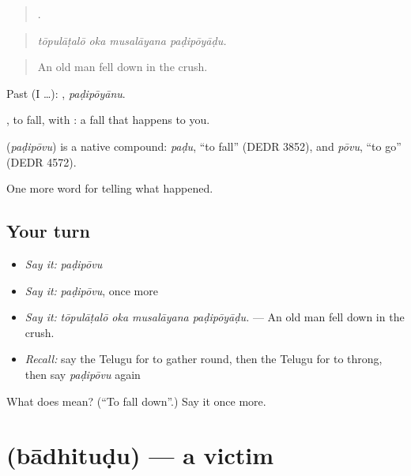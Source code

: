\begin{quote}
   .
\end{quote}

\begin{quote}
\emph{tōpulāṭalō oka musalāyana paḍipōyāḍu.}
\end{quote}

\begin{quote}
An old man fell down in the crush.
\end{quote}

Past (I …): , \emph{paḍipōyānu}.

, to fall, with : a fall that happens to you.

\begin{cousinweb}
\textbf{} (\emph{paḍipōvu}) is a native compound: \emph{paḍu}, \textquotedblleft{}to fall\textquotedblright{} (DEDR 3852), and \emph{pōvu}, \textquotedblleft{}to go\textquotedblright{} (DEDR 4572).
\end{cousinweb}

\begin{grammarlens}[title={What you've built}]
One more word for telling what happened.
\end{grammarlens}

\subsection*{Your turn}
\begin{itemize}
\raggedright
  \item \emph{Say it:} \emph{paḍipōvu}
  \item \emph{Say it:} \emph{paḍipōvu}, once more
  \item \emph{Say it:} \emph{tōpulāṭalō oka musalāyana paḍipōyāḍu.} — An old man fell down in the crush.
  \item \emph{Recall:} say the Telugu for to gather round, then the Telugu for to throng, then say \emph{paḍipōvu} again
\end{itemize}

\begin{tcolorbox}[breakable,colback=teal!4,colframe=teal!35!black,title={Before you move on}]
What does  mean? (\textquotedblleft{}To fall down\textquotedblright{}.) Say it once more.
\end{tcolorbox}
\section[\texorpdfstring{\te{బాధితుడు} (bādhituḍu)}{బాధితుడు (bādhituḍu)}]{ (bādhituḍu) — a victim}

